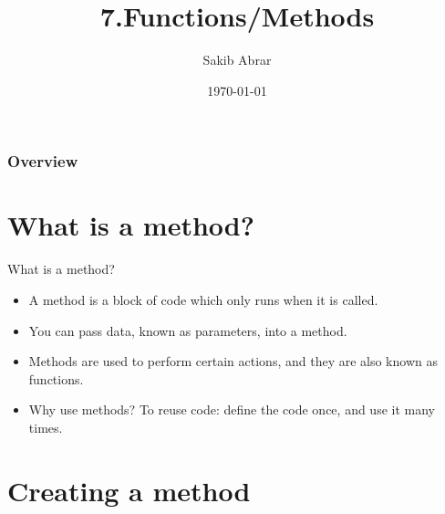 \documentclass{beamer}
\title[Functions]{7.Functions/Methods} %
\author{Sakib Abrar} %
\institute[BUET] %
{
CSE\\~\\Bangladesh University of Engineering \& Technology \\ %
\medskip
\textit{sakib.cghs@gmail.com} %
}
\date{\today} %
\begin{document}
\begin{frame}
\titlepage %
\end{frame}

\begin{frame}
\frametitle{Overview} %
\tableofcontents %
\end{frame}


\section{What is a method?}


\begin{frame}{What is a method?}
\begin{itemize}
\item A method is a block of code which only runs when it is called.\\
\item You can pass data, known as parameters, into a method.\\
\item Methods are used to perform certain actions, and they are also known as functions.\\
\item Why use methods? To reuse code: define the code once, and use it many times.\\
\end{itemize}
\end{frame}

\section{Creating a method}
\end{document}
